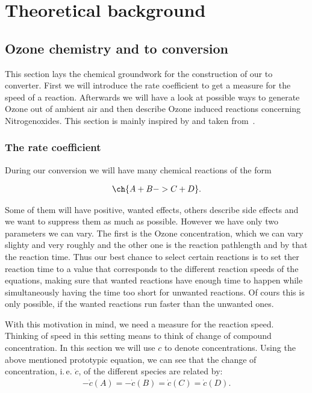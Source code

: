 \section{Theoretical background}
\label{sec:theory}

\subsection{Ozone chemistry and  to  conversion}
\label{sec:chemistry}

This section lays the chemical groundwork for the construction of our
 to  converter. First we will introduce the rate
coefficient to get a measure for the speed of a
reaction. Afterwards we will have a look at possible ways to generate
Ozone out of ambient air and then describe Ozone induced reactions
concerning Nitrogenoxides. This section is mainly inspired by and
taken from~\cite{bsc}.

\subsubsection{The rate coefficient}
\label{sec:rate}

During our conversion we will have many chemical reactions of the form

\begin{align*}
  \ch{A + B -> C + D}.
\end{align*}

Some of them will have positive, wanted effects, others describe side
effects and we want to suppress them as much as possible. However we
have only two parameters we can vary. The first is the Ozone
concentration, which we can vary slighty and very roughly and the
other one is the reaction pathlength and by that the reaction
time. Thus our best chance to select certain reactions is to set ther
reaction time to a value that corresponds to the different reaction
speeds of the equations, making sure that wanted reactions have enough
time to happen while simultaneously having the time too short for
unwanted reactions. Of cours this is only possible, if the wanted
reactions run faster than the unwanted ones. 

With this motivation in mind, we need a measure for the reaction
speed. Thinking of speed in this setting means to think of change of
compound concentration. In this section we will use $c$ to denote
concentrations. Using the above mentioned prototypic equation, we can
see that the change of concentration, i.\,e. $\dot c$, of the
different species are related by:
\begin{align*}
  -\dot c(A) = - \dot c(B) = \dot c(C) = \dot c(D).
\end{align*}

